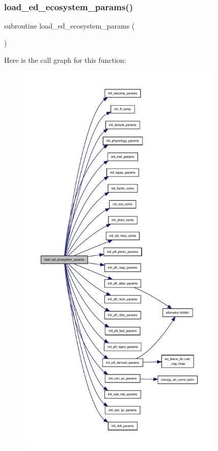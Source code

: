\subsubsection{\texorpdfstring{load\+\_\+ed\+\_\+ecosystem\+\_\+params()}{load\_ed\_ecosystem\_params()}}
{\footnotesize\ttfamily subroutine load\+\_\+ed\+\_\+ecosystem\+\_\+params (\begin{DoxyParamCaption}{ }\end{DoxyParamCaption})}

Here is the call graph for this function\+:
\nopagebreak
\begin{figure}[H]
\begin{center}
\leavevmode
\includegraphics[height=550pt]{ed__params_8f90_af74bdb1b6959fc9b59288f80e8832f14_cgraph}
\end{center}
\end{figure}
\mbox{\label{ed__params_8f90_a2c0c887700d85a5be6fbd26b071c8da6}} 

